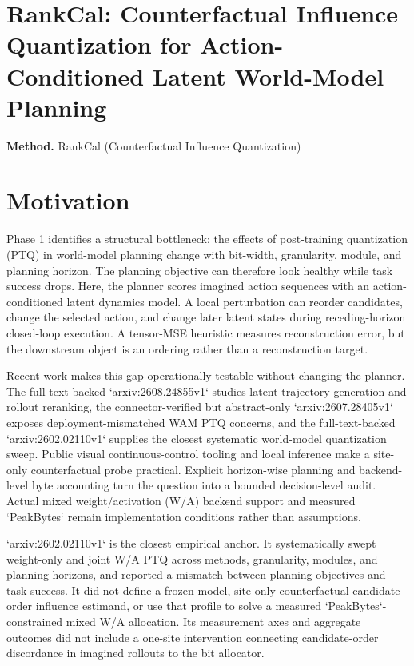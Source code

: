\documentclass[10pt,a4paper]{article}
\begin{document}
\section*{RankCal: Counterfactual Influence Quantization for Action-Conditioned Latent World-Model Planning}
\textbf{Method.} RankCal (Counterfactual Influence Quantization)
\section*{Motivation}
Phase 1 identifies a structural bottleneck: the effects of post-training quantization (PTQ) in world-model planning change with bit-width, granularity, module, and planning horizon. The planning objective can therefore look healthy while task success drops. Here, the planner scores imagined action sequences with an action-conditioned latent dynamics model. A local perturbation can reorder candidates, change the selected action, and change later latent states during receding-horizon closed-loop execution. A tensor-MSE heuristic measures reconstruction error, but the downstream object is an ordering rather than a reconstruction target.

Recent work makes this gap operationally testable without changing the planner. The full-text-backed `arxiv:2608.24855v1` studies latent trajectory generation and rollout reranking, the connector-verified but abstract-only `arxiv:2607.28405v1` exposes deployment-mismatched WAM PTQ concerns, and the full-text-backed `arxiv:2602.02110v1` supplies the closest systematic world-model quantization sweep. Public visual continuous-control tooling and local inference make a site-only counterfactual probe practical. Explicit horizon-wise planning and backend-level byte accounting turn the question into a bounded decision-level audit. Actual mixed weight/activation (W/A) backend support and measured `PeakBytes` remain implementation conditions rather than assumptions.

`arxiv:2602.02110v1` is the closest empirical anchor. It systematically swept weight-only and joint W/A PTQ across methods, granularity, modules, and planning horizons, and reported a mismatch between planning objectives and task success. It did not define a frozen-model, site-only counterfactual candidate-order influence estimand, or use that profile to solve a measured `PeakBytes`-constrained mixed W/A allocation. Its measurement axes and aggregate outcomes did not include a one-site intervention connecting candidate-order discordance in imagined rollouts to the bit allocator.
\end{document}

